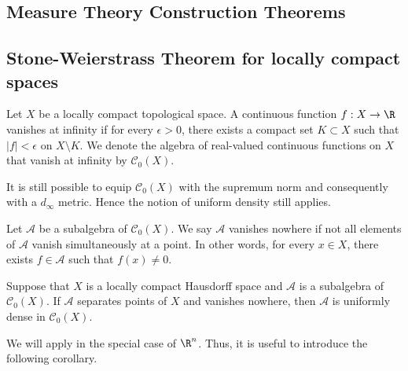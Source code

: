 
\subsection{Measure Theory Construction Theorems}

\begin{theorem}

\end{theorem}

\subsection{Stone-Weierstrass Theorem for locally compact spaces}

\begin{definition}
Let $X$ be a locally compact topological space. A continuous function $f : X \to \R$ vanishes at infinity if for every $\epsilon > 0$, there exists a compact set $K \subset X$ such that $|f| < \epsilon$ on $X \setminus K$. We denote the algebra of real-valued continuous functions on $X$ that vanish at infinity by $\mathcal{C}_0(X)$.
\end{definition}

\begin{remark}
It is still possible to equip $\mathcal{C}_0(X)$ with the supremum norm and consequently with a $d_\infty$ metric.
Hence the notion of uniform density still applies.
\end{remark}
\begin{definition}
Let $\mathcal{A}$ be a subalgebra of $\mathcal{C}_0(X)$. We say $\mathcal{A}$ vanishes nowhere if not all elements of $\mathcal{A}$ vanish simultaneously at a point. In other words, for every $x \in X$, there exists $f \in \mathcal{A}$ such that $f(x) \neq 0$.
\end{definition}

\begin{theorem}
\label{thm:top:stone-weierstrass:lch}
Suppose that $X$ is a locally compact Hausdorff space and $\mathcal{A}$ is a subalgebra of $\mathcal{C}_0(X)$. If $\mathcal{A}$ separates points of $X$ and vanishes nowhere, then $\mathcal{A}$ is uniformly dense in $\mathcal{C}_0(X)$.
\end{theorem}

We will apply   in the special case of $\R^n$. Thus, it is useful to introduce the following corollary.

